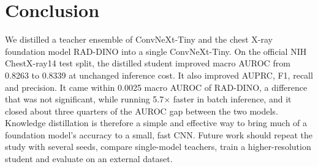\documentclass[conference]{IEEEtran}
\begin{document}
\section{Conclusion}
\label{sec:conclusion}

We distilled a teacher ensemble of ConvNeXt-Tiny and the chest X-ray foundation model RAD-DINO into a single ConvNeXt-Tiny. On the official NIH ChestX-ray14 test split, the distilled student improved macro AUROC from 0.8263 to 0.8339 at unchanged inference cost. It also improved AUPRC, F1, recall and precision. It came within 0.0025 macro AUROC of RAD-DINO, a difference that was not significant, while running 5.7$\times$ faster in batch inference, and it closed about three quarters of the AUROC gap between the two models. Knowledge distillation is therefore a simple and effective way to bring much of a foundation model's accuracy to a small, fast CNN. Future work should repeat the study with several seeds, compare single-model teachers, train a higher-resolution student and evaluate on an external dataset.



\end{document}
